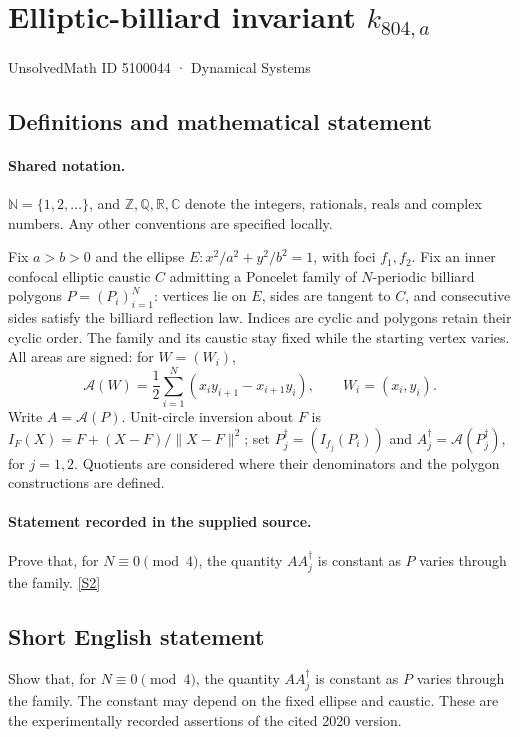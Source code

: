 \documentclass[11pt]{article}
\newcommand{\sref}[2]{\hyperlink{source:#1:#2}{[S#2]}}
\begin{document}
\setcounter{section}{5100043}
\section{Elliptic-billiard invariant $k_{804,a}$}\label{5100044}
{\small\sffamily UnsolvedMath ID 5100044 · Dynamical Systems}
\subsection{Definitions and mathematical statement}

\paragraph{Shared notation.}$\mathbb N=\{1,2,\ldots\}$, and $\mathbb Z,\mathbb Q,\mathbb R,\mathbb C$ denote the integers, rationals, reals and complex numbers. Any other conventions are specified locally.


Fix $a>b>0$ and the ellipse $E:x^2/a^2+y^2/b^2=1$, with foci $f_1,f_2$. Fix an inner confocal elliptic caustic $C$ admitting a Poncelet family of $N$-periodic billiard polygons $P=(P_i)_{i=1}^N$: vertices lie on $E$, sides are tangent to $C$, and consecutive sides satisfy the billiard reflection law. Indices are cyclic and polygons retain their cyclic order. The family and its caustic stay fixed while the starting vertex varies. All areas are signed: for $W=(W_i)$,
\[\mathcal A(W)=\frac12\sum_{i=1}^N(x_i y_{i+1}-x_{i+1}y_i),\qquad W_i=(x_i,y_i).\]
Write $A=\mathcal A(P)$. Unit-circle inversion about $F$ is $I_F(X)=F+(X-F)/\lVert X-F\rVert^2$; set $P_j^\dagger=(I_{f_j}(P_i))$ and $A_j^\dagger=\mathcal A(P_j^\dagger)$, for $j=1,2$. Quotients are considered where their denominators and the polygon constructions are defined.
\paragraph{Statement recorded in the supplied source.}
Prove that, for $N\equiv0\pmod4$, the quantity $AA_j^\dagger$ is constant as $P$ varies through the family. \sref{5100044}{2}
\subsection{Short English statement}
Show that, for $N\equiv0\pmod4$, the quantity $AA_j^\dagger$ is constant as $P$ varies through the family. The constant may depend on the fixed ellipse and caustic. These are the experimentally recorded assertions of the cited 2020 version.
\end{document}

